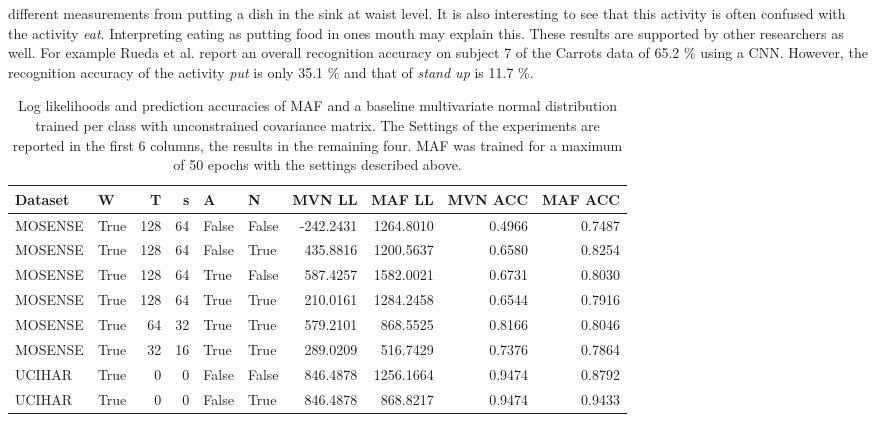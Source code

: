 \documentclass[11pt,titlepage,oneside,openany]{book}
\begin{document}
different measurements from putting a dish in the sink at waist level. It is also interesting to see that this activity is often confused with the activity \emph{eat}. Interpreting eating as putting food in ones mouth may explain this. These results are supported by other researchers as well. For example Rueda et al. \cite{rueda_combining_2019} report an overall recognition accuracy on subject 7 of the Carrots data of 65.2 \% using a CNN. However, the recognition accuracy of the activity \emph{put} is only 35.1 \% and that of \emph{stand up} is 11.7 \%.


\begin{table}
	\centering
	\tiny
	\begin{tabularx}{0.85\textwidth}{llrrllrrrr}
		\toprule
		Dataset &  W &  T &  s &  A &  N &    MVN LL &    MAF LL &  MVN ACC &  MAF ACC \\
		\midrule
		MOSENSE &    True &     128 &      64 &    False &  False & -242.2431 & 1264.8010 &   0.4966 &   0.7487 \\
		MOSENSE &    True &     128 &      64 &    False &   True &  435.8816 & 1200.5637 &   0.6580 &   0.8254 \\
		MOSENSE &    True &     128 &      64 &     True &  False &  587.4257 & 1582.0021 &   0.6731 &   0.8030 \\
		MOSENSE &    True &     128 &      64 &     True &   True &  210.0161 & 1284.2458 &   0.6544 &   0.7916 \\
		MOSENSE &    True &      64 &      32 &     True &   True &  579.2101 &  868.5525 &   0.8166 &   0.8046 \\
		MOSENSE &    True &      32 &      16 &     True &   True &  289.0209 &  516.7429 &   0.7376 &   0.7864 \\
		UCIHAR &    True &       0 &       0 &    False &  False &  846.4878 & 1256.1664 &   0.9474 &   0.8792 \\
		UCIHAR &    True &       0 &       0 &    False &   True &  846.4878 &  868.8217 &   0.9474 &   0.9433 \\
		\bottomrule
	\end{tabularx}
	\caption[Evaluation Results Motion Sense]{\label{tab:eps50} Log likelihoods and prediction accuracies of MAF and a baseline multivariate normal distribution trained per class with unconstrained covariance matrix. The Settings of the experiments are reported in the first 6 columns, the results in the remaining four. MAF was trained for a maximum of 50 epochs with the settings described above.}
\end{table}
\end{document}
